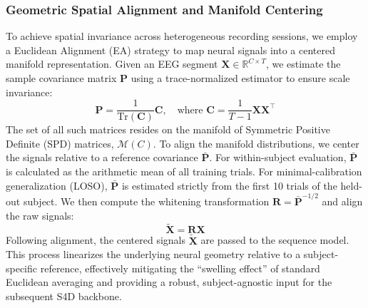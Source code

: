 \documentclass[11pt,a4paper]{article}
\begin{document}
\subsubsection{Geometric Spatial Alignment and Manifold Centering}
To achieve spatial invariance across heterogeneous recording sessions, we employ a Euclidean Alignment (EA) strategy to map neural signals into a centered manifold representation. Given an EEG segment $\mathbf{X} \in \mathbb{R}^{C \times T}$, we estimate the sample covariance matrix $\mathbf{P}$ using a trace-normalized estimator to ensure scale invariance:
\begin{equation}
    \mathbf{P} = \frac{1}{\text{Tr}(\mathbf{C})} \mathbf{C}, \quad \text{where } \mathbf{C} = \frac{1}{T-1} \mathbf{X}\mathbf{X}^\top
\end{equation}
The set of all such matrices resides on the manifold of Symmetric Positive Definite (SPD) matrices, $\mathcal{M}(C)$. To align the manifold distributions, we center the signals relative to a reference covariance $\bar{\mathbf{P}}$. For within-subject evaluation, $\bar{\mathbf{P}}$ is calculated as the arithmetic mean of all training trials. For minimal-calibration generalization (LOSO), $\bar{\mathbf{P}}$ is estimated strictly from the first 10 trials of the held-out subject. We then compute the whitening transformation $\mathbf{R} = \bar{\mathbf{P}}^{-1/2}$ and align the raw signals:
\begin{equation}
    \tilde{\mathbf{X}} = \mathbf{R} \mathbf{X}
\end{equation}
Following alignment, the centered signals $\tilde{\mathbf{X}}$ are passed to the sequence model. This process linearizes the underlying neural geometry relative to a subject-specific reference, effectively mitigating the ``swelling effect'' of standard Euclidean averaging and providing a robust, subject-agnostic input for the subsequent S4D backbone.
\end{document}
